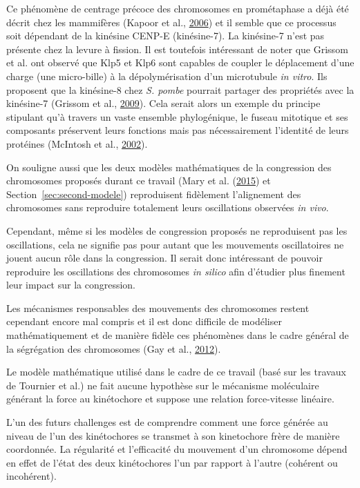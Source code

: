 \documentclass[12pt,a4paper,twoside,openright]{book}
\begin{document}
Ce phénomène de centrage précoce des chromosomes en prométaphase a déjà
été décrit chez les mammifères (Kapoor et al.,
\protect\hyperlink{ref-Kapoor2006}{2006}) et il semble que ce processus
soit dépendant de la kinésine CENP-E (kinésine-7). La kinésine-7 n'est
pas présente chez la levure à fission. Il est toutefois intéressant de
noter que Grissom et al. ont observé que Klp5 et Klp6 sont capables de
coupler le déplacement d'une charge (une micro-bille) à la
dépolymérisation d'un microtubule \emph{in vitro}. Ils proposent que la
kinésine-8 chez \emph{S. pombe} pourrait partager des propriétés avec la
kinésine-7 (Grissom et al., \protect\hyperlink{ref-Grissom2009}{2009}).
Cela serait alors un exemple du principe stipulant qu'à travers un vaste
ensemble phylogénique, le fuseau mitotique et ses composants préservent
leurs fonctions mais pas nécessairement l'identité de leurs protéines
(McIntosh et al., \protect\hyperlink{ref-McIntosh2002b}{2002}).

On souligne aussi que les deux modèles mathématiques de la congression
des chromosomes proposés durant ce travail (Mary et al.
(\protect\hyperlink{ref-Mary2015}{2015}) et
Section~\ref{sec:second-modele}) reproduisent fidèlement l'alignement
des chromosomes sans reproduire totalement leurs oscillations observées
\emph{in vivo}.

Cependant, même si les modèles de congression proposés ne reproduisent
pas les oscillations, cela ne signifie pas pour autant que les
mouvements oscillatoires ne jouent aucun rôle dans la congression. Il
serait donc intéressant de pouvoir reproduire les oscillations des
chromosomes \emph{in silico} afin d'étudier plus finement leur impact
sur la congression.

Les mécanismes responsables des mouvements des chromosomes restent
cependant encore mal compris et il est donc difficile de modéliser
mathématiquement et de manière fidèle ces phénomènes dans le cadre
général de la ségrégation des chromosomes (Gay et al.,
\protect\hyperlink{ref-Gay2012a}{2012}).

Le modèle mathématique utilisé dans le cadre de ce travail (basé sur les
travaux de Tournier et al.) ne fait aucune hypothèse sur le mécanisme
moléculaire générant la force au kinétochore et suppose une relation
force-vitesse linéaire.

L'un des futurs challenges est de comprendre comment une force générée
au niveau de l'un des kinétochores se transmet à son kinetochore frère
de manière coordonnée. La régularité et l'efficacité du mouvement d'un
chromosome dépend en effet de l'état des deux kinétochores l'un par
rapport à l'autre (cohérent ou incohérent).
\end{document}
